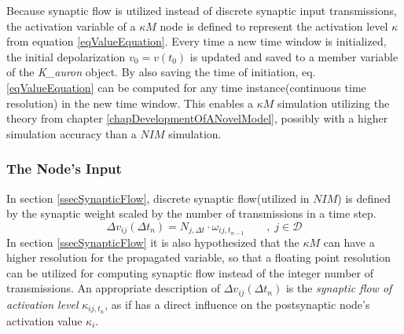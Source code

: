 		Because synaptic flow is utilized instead of discrete synaptic input transmissions, the activation variable of a $\kappa M$ node is defined 
			to represent the activation level $\kappa$ from equation \ref{eqValueEquation}.
		Every time a new time window is initialized, the initial depolarization $v_0 = v(t_0)$ is updated and saved to a member variable of the \emph{K\_auron} object.
		By also saving the time of initiation, eq. \eqref{eqValueEquation} can be computed for any time instance(continuous time resolution) in the new time window.
		This enables a $\kappa M$ simulation utilizing the theory from chapter \ref{chapDevelopmentOfANovelModel}, possibly with a higher simulation accuracy than a $NIM$ simulation.


		\subsubsection{The Node's Input}	
		
		In section \ref{ssecSynapticFlow}, discrete synaptic flow(utilized in $NIM$) is defined by the synaptic weight scaled by the number of transmissions in a time step.
\begin{equation}
		\Delta v_{ij}(\Delta t_n) = N_{j, \Delta t} \cdot \omega_{ij, t_{n-1}} \qquad,\;j\in\mathcal{D}
		\nonumber
\end{equation}
		In section \ref{ssecSynapticFlow} it is also hypothesized that the $\kappa M$ can have a higher resolution for the propagated variable, so that a floating point resolution can be utilized for computing synaptic flow instead of the integer number of transmissions.
		An appropriate description of $\Delta v_{ij}(\Delta t_n)$  is the \emph{synaptic flow of activation level} $\kappa_{ij, t_n}$, as if has a direct influence on the postsynaptic node's activation value $\kappa_i$.

